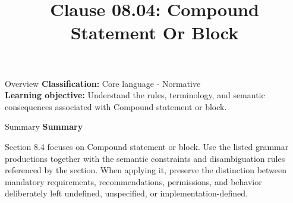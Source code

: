 \documentclass[10pt,letterpaper]{article}
\title{Clause 08.04: Compound Statement Or Block}
\author{}
\date{}
\begin{document}
\maketitle
\begin{CornellOverviewBox}{Overview}
\textbf{Classification:} Core language - Normative\\[2pt]
\textbf{Learning objective:} Understand the rules, terminology, and semantic consequences associated with Compound statement or block.
\end{CornellOverviewBox}\begin{CornellSummaryBox}{Summary}
{\sffamily\bfseries\color{Accent} Summary}\par\vspace{3pt}Section 8.4 focuses on Compound statement or block. Use the listed grammar productions together with the semantic constraints and disambiguation rules referenced by the section. When applying it, preserve the distinction between mandatory requirements, recommendations, permissions, and behavior deliberately left undefined, unspecified, or implementation-defined.
\end{CornellSummaryBox}
\end{document}
